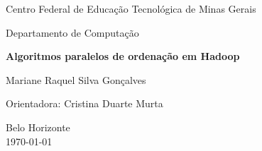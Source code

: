 

\begin{titlepage}

  \vfill

  \begin{center}
    \begin{large}
      Centro Federal de Educação Tecnológica de Minas Gerais
    \end{large}
  \end{center}

  \begin{center}
    \begin{large}
      Departamento de Computação
    \end{large}
  \end{center}

  \vfill

  \begin{center}
    \begin{Large}
      \textbf{Algoritmos paralelos de ordenação em Hadoop} \\[1.4cm]            
    \end{Large}
  \end{center}


  \vfill

  \begin{center}
    \begin{large}
      Mariane Raquel Silva Gonçalves	
    \end{large}
  \end{center}

  \begin{center}
    \begin{large}
      Orientadora: Cristina Duarte Murta
    \end{large}
  \end{center}

  \vfill

  \begin{center}
    \begin{large}
      Belo Horizonte \\
      \today \\
    \end{large}
  \end{center}
  \end{titlepage}

